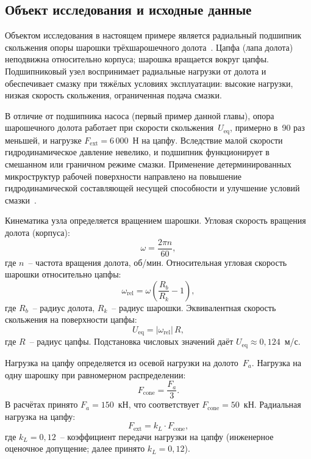 \subsection{Объект исследования и исходные данные}

Объектом исследования в настоящем примере является радиальный
подшипник скольжения опоры шарошки трёхшарошечного долота~\cite{bashmur2024a,bashmur2024b}.
Цапфа (лапа долота) неподвижна относительно корпуса; шарошка
вращается вокруг цапфы. Подшипниковый узел воспринимает
радиальные нагрузки от долота и обеспечивает смазку при тяжёлых
условиях эксплуатации: высокие нагрузки, низкая скорость
скольжения, ограниченная подача смазки.

В отличие от подшипника насоса (первый пример данной главы), опора шарошечного долота
работает при скорости скольжения~$U_{\mathrm{eq}}$, примерно
в~90 раз меньшей, и нагрузке $F_{\mathrm{ext}} = 6\,000$~Н на цапфу. Вследствие малой
скорости гидродинамическое давление невелико, и подшипник
функционирует в смешанном или граничном режиме смазки. Применение
детерминированных микроструктур рабочей поверхности направлено
на повышение гидродинамической составляющей несущей способности
и улучшение условий смазки~\cite{bashmur2022,bashmur2023a,bashmur2023b,guo2005}.

Кинематика узла определяется вращением шарошки. Угловая скорость
вращения долота (корпуса):
\begin{equation}
  \omega = \frac{2\pi n}{60},
  \label{eq:bit_omega}
\end{equation}
где $n$~-- частота вращения долота, об/мин. Относительная угловая
скорость шарошки относительно цапфы:
\begin{equation}
  \omega_{\mathrm{rel}} = \omega
    \left(\frac{R_b}{R_k} - 1\right),
  \label{eq:bit_omega_rel}
\end{equation}
где $R_b$~-- радиус долота, $R_k$~-- радиус шарошки.
Эквивалентная скорость скольжения на поверхности цапфы:
\begin{equation}
  U_{\mathrm{eq}} = |\omega_{\mathrm{rel}}|\, R,
  \label{eq:bit_Ueq}
\end{equation}
где $R$~-- радиус цапфы. Подстановка числовых значений даёт
$U_{\mathrm{eq}} \approx 0{,}124$~м/с.

Нагрузка на цапфу определяется из осевой нагрузки на долото~$F_a$.
Нагрузка на одну шарошку при равномерном распределении:
\begin{equation}
  F_{\mathrm{cone}} = \frac{F_a}{3}.
  \label{eq:bit_Fcone}
\end{equation}
В расчётах принято $F_a = 150$~кН, что соответствует
$F_{\mathrm{cone}} = 50$~кН.
Радиальная нагрузка на цапфу:
\begin{equation}
  F_{\mathrm{ext}} = k_L \cdot F_{\mathrm{cone}},
  \label{eq:bit_Fext}
\end{equation}
где $k_L = 0{,}12$~-- коэффициент передачи нагрузки на цапфу
(инженерное оценочное допущение; далее принято $k_L = 0{,}12$).

